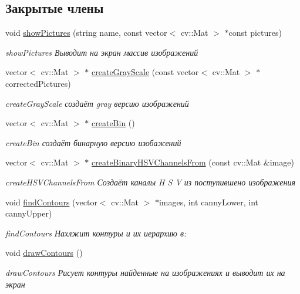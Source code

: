 \subsection*{Закрытые члены}
\begin{DoxyCompactItemize}
\item 
void \hyperlink{class_search_outlines_abbd427cb74410f5919d779af6041f3b6}{show\+Pictures} (string name, const vector$<$ cv\+::\+Mat $>$ $\ast$const pictures)
\begin{DoxyCompactList}\small\item\em show\+Pictures Выводит на экран массив изображений  \end{DoxyCompactList}\item 
vector$<$ cv\+::\+Mat $>$ $\ast$ \hyperlink{class_search_outlines_ae2c5d2a7cf350f53dec9e1d966a5045a}{create\+Gray\+Scale} (const vector$<$ cv\+::\+Mat $>$ $\ast$corrected\+Pictures)
\begin{DoxyCompactList}\small\item\em create\+Gray\+Scale создаёт gray версию изображений \end{DoxyCompactList}\item 
vector$<$ cv\+::\+Mat $>$ $\ast$ \hyperlink{class_search_outlines_ac7706a914bd5abb1d2f21ecf13192461}{create\+Bin} ()
\begin{DoxyCompactList}\small\item\em create\+Bin создаёт бинарную версию изобажений \end{DoxyCompactList}\item 
vector$<$ cv\+::\+Mat $>$ $\ast$ \hyperlink{class_search_outlines_afb719de91ae7c9c8bcaf7e731223d9d5}{create\+Binary\+H\+S\+V\+Channels\+From} (const cv\+::\+Mat \&image)
\begin{DoxyCompactList}\small\item\em create\+H\+S\+V\+Channels\+From Создаёт каналы H S V из поступившено изображения \end{DoxyCompactList}\item 
void \hyperlink{class_search_outlines_a9885ced6ec7391c1a702f6b03bf4fe14}{find\+Contours} (vector$<$ cv\+::\+Mat $>$ $\ast$images, int canny\+Lower, int canny\+Upper)
\begin{DoxyCompactList}\small\item\em find\+Contours Нахлжит контуры и их иерархию в\+: \end{DoxyCompactList}\item 
void \hyperlink{class_search_outlines_aadf8088a83c200e865329c78e58b8674}{draw\+Contours} ()
\begin{DoxyCompactList}\small\item\em draw\+Contours Рисует контуры найденные на изображениях и выводит их на экран \end{DoxyCompactList}\item 

\end{DoxyCompactItemize}
